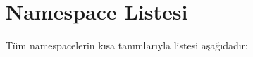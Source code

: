 \section{Namespace Listesi}
Tüm namespace\textquotesingle{}lerin kısa tanımlarıyla listesi aşağıdadır\+:\begin{DoxyCompactList}
\item{}
\end{DoxyCompactList}
